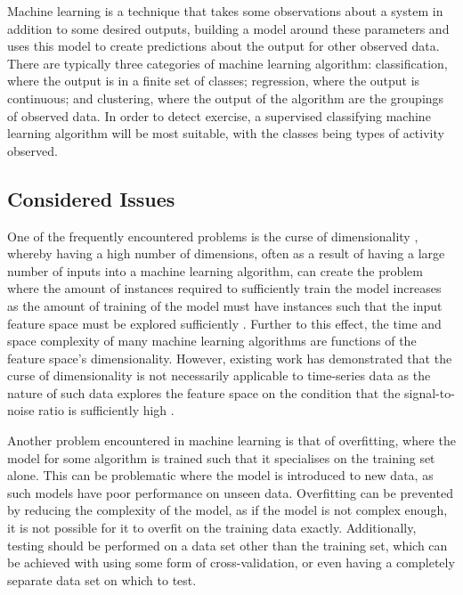 \label{ml}

Machine learning is a technique that takes some observations about a system in addition to some desired outputs, building a model around these parameters and uses this model to create predictions about the output for other observed data. There are typically three categories of machine learning algorithm: classification, where the output is in a finite set of classes; regression, where the output is continuous; and clustering, where the output of the algorithm are the groupings of observed data. In order to detect exercise, a supervised classifying machine learning algorithm will be most suitable, with the classes being types of activity observed.

\subsection{Considered Issues}

One of the frequently encountered problems is the curse of dimensionality \cite{bellman1957dynamic}, whereby having a high number of dimensions, often as a result of having a large number of inputs into a machine learning algorithm, can create the problem where the amount of instances required to sufficiently train the model increases as the amount of training of the model must have instances such that the input feature space must be explored sufficiently \cite{oommen2008objective}. Further to this effect, the time and space complexity of many machine learning algorithms are functions of the feature space's dimensionality. However, existing work has demonstrated that the curse of dimensionality is not necessarily applicable to time-series data as the nature of such data explores the feature space on the condition that the signal-to-noise ratio is sufficiently high \cite{bernecker2011quality}.

Another problem encountered in machine learning is that of overfitting, where the model for some algorithm is trained such that it specialises on the training set alone. This can be problematic where the model is introduced to new data, as such models have poor performance on unseen data. Overfitting can be prevented by reducing the complexity of the model, as if the model is not complex enough, it is not possible for it to overfit on the training data exactly. Additionally, testing should be performed on a data set other than the training set, which can be achieved with using some form of cross-validation, or even having a completely separate data set on which to test.

